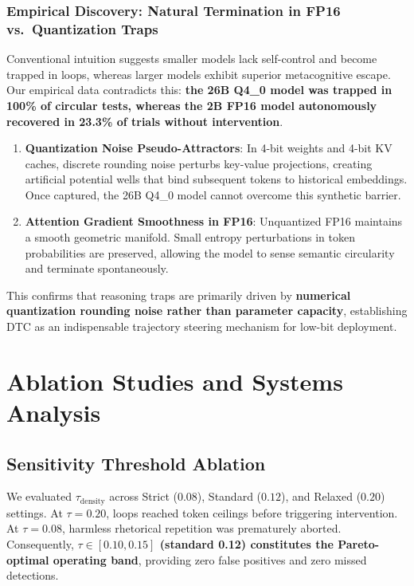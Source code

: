 \documentclass[11pt,a4paper]{article}
\begin{document}
\subsubsection{Empirical Discovery: Natural Termination in FP16 vs.\ Quantization Traps}
Conventional intuition suggests smaller models lack self-control and become trapped in loops, whereas larger models exhibit superior metacognitive escape. Our empirical data contradicts this: \textbf{the 26B Q4\_0 model was trapped in 100\% of circular tests, whereas the 2B FP16 model autonomously recovered in 23.3\% of trials without intervention}.
\begin{enumerate}
    \item \textbf{Quantization Noise Pseudo-Attractors}: In 4-bit weights and 4-bit KV caches, discrete rounding noise perturbs key-value projections, creating artificial potential wells that bind subsequent tokens to historical embeddings. Once captured, the 26B Q4\_0 model cannot overcome this synthetic barrier.
    \item \textbf{Attention Gradient Smoothness in FP16}: Unquantized FP16 maintains a smooth geometric manifold. Small entropy perturbations in token probabilities are preserved, allowing the model to sense semantic circularity and terminate spontaneously.
\end{enumerate}
This confirms that reasoning traps are primarily driven by \textbf{numerical quantization rounding noise rather than parameter capacity}, establishing DTC as an indispensable trajectory steering mechanism for low-bit deployment.

\section{Ablation Studies and Systems Analysis}

\subsection{Sensitivity Threshold Ablation}
We evaluated $\tau_{\mathrm{density}}$ across Strict ($0.08$), Standard ($0.12$), and Relaxed ($0.20$) settings. At $\tau=0.20$, loops reached token ceilings before triggering intervention. At $\tau=0.08$, harmless rhetorical repetition was prematurely aborted. Consequently, \textbf{$\tau \in [0.10, 0.15]$ (standard 0.12) constitutes the Pareto-optimal operating band}, providing zero false positives and zero missed detections.
\end{document}

